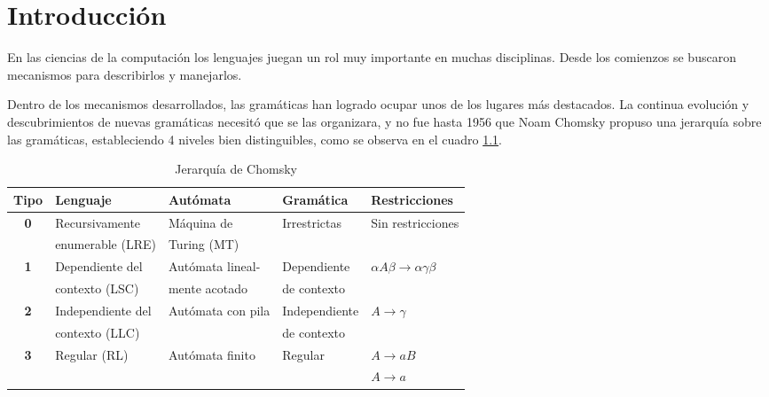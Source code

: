\chapter{Introducci\'on}
\label{chap:intro}

\minitoc

En las ciencias de la computación los lenguajes juegan un rol muy importante en muchas disciplinas. Desde los comienzos se buscaron mecanismos para describirlos y manejarlos.

Dentro de los mecanismos desarrollados, las gramáticas han logrado ocupar unos de los lugares más destacados. La continua evolución y descubrimientos de nuevas gramáticas necesitó que se las organizara, y no fue hasta 1956 que Noam Chomsky propuso una jerarquía sobre las gramáticas, estableciendo 4 niveles bien distinguibles, como se observa en el cuadro \ref{chomsky}.

\begin{table}[!ht]\centering\small
\begin{tabular}{| c | p{3.1cm} | p{3.2cm} | p{2.4cm} | p{2.9cm}|}
\hline

\rowcolor{gris} \textbf{Tipo} & \textbf{Lenguaje} & \textbf{Autómata} & \textbf{Gramática} &  \textbf{Restricciones} \\ \hline

\multirow{2}{*}{\textbf{0}} & Recursivamente   & Máquina de  & \multirow{2}{*}{Irrestrictas} & \multirow{2}{*}{Sin restricciones} \\ 
                            & enumerable (LRE) & Turing (MT) & &  \\ \hline

\multirow{2}{*}{\textbf{1}} & Dependiente del & Autómata lineal- & Dependiente &\multirow{2}{*}{$\alpha A \beta \rightarrow \alpha\gamma\beta$} \\ 
                            & contexto (LSC)  & mente acotado              & de  contexto & \\ \hline

\multirow{2}{*}{\textbf{2}} & Independiente del & \multirow{2}{*}{Autómata con pila} & Independiente & \multirow{2}{*}{$A \rightarrow \gamma$} \\ 
                            & contexto (LLC)    &           & de contexto& \\ \hline

\multirow{2}{*}{\textbf{3}} & \multirow{2}{*}{Regular (RL)} & \multirow{2}{*}{Autómata finito} & \multirow{2}{*}{Regular} &$A \rightarrow aB$ \\ 
                            &              &                 & & $A \rightarrow a$ \\ \hline
\end{tabular}\caption{\label{chomsky} Jerarquía de Chomsky}
\end{table}

